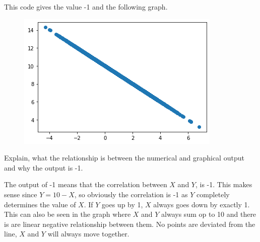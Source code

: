 \begin{exercise}[1]
This code gives the value -1 and the following graph.
\begin{figure}[H]
    \centering
    \includegraphics[width = 0.5 \textwidth]{plotexam.png}
\end{figure}
\noindent
Explain, what the relationship is between the numerical and graphical output and why the output is -1.
\begin{solution}
The output of -1 means that the correlation between $X$ and $Y$, is -1. This makes sense since $Y = 10 - X$, so obviously the correlation is -1 as $Y$ completely determines the value of $X$. If $Y$ goes up by 1, $X$ always goes down by exactly 1. This can also be seen in the graph where $X$ and $Y$ always sum op to 10 and there is are linear negative relationship between them. No points are deviated from the line, $X$ and $Y$ will always move together.
\end{solution}
\end{exercise}
